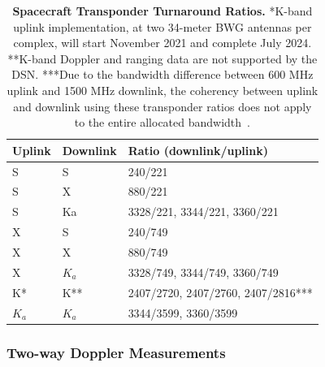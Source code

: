 \begin{table}[htp!]
    \renewcommand{\arraystretch}{1.5}
    \centering
    \caption{
        \textbf{Spacecraft Transponder Turnaround Ratios.} *K-band uplink
        implementation, at two 34-meter BWG antennas per complex, will start
        November 2021 and complete July 2024. **K-band Doppler and ranging data are
        not supported by the DSN. ***Due to the bandwidth difference between 600 MHz
        uplink and 1500 MHz downlink, the coherency between uplink and downlink
        using these transponder ratios does not apply to the entire allocated
        bandwidth~\cite{Berner2020}.
    }
    \label{tab:turnaround-ratios}
    \begin{tabular}{lll}
        \hline
        \textbf{Uplink} & \textbf{Downlink} & \textbf{Ratio (downlink/uplink)}   \\
        \hline\hline
        S               & S                 & 240/221                            \\
        S               & X                 & 880/221                            \\
        S               & Ka                & 3328/221, 3344/221, 3360/221       \\
        X               & S                 & 240/749                            \\
        X               & X                 & 880/749                            \\
        X               & $K_a$             & 3328/749, 3344/749, 3360/749       \\
        K*              & K**               & 2407/2720, 2407/2760, 2407/2816*** \\
        $K_a$           & $K_a$             & 3344/3599, 3360/3599               \\
        \hline
    \end{tabular}
\end{table}

\subsubsection{Two-way Doppler Measurements}

